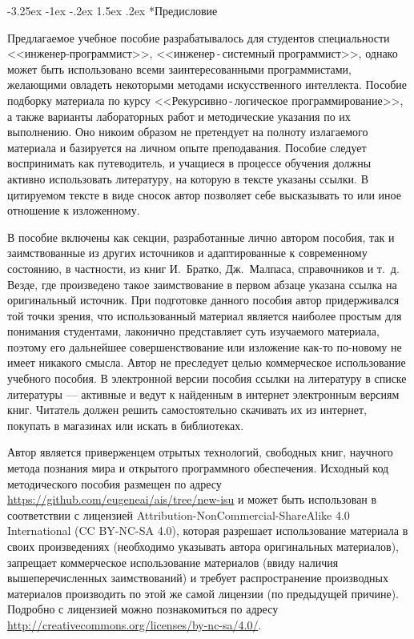 \documentclass[12pt, openany, twoside]{book} %
\makeatletter
\renewcommand\section{\@startsection {section}{1}{\z@}%
                                   {-3.25ex \@plus -1ex \@minus -.2ex}%
                                   {1.5ex \@plus.2ex}%
                                   {\normalfont\large\bfseries}}
\makeatother
\begin{document}
\newpage
\section*{Предисловие}
\thispagestyle{empty}

Предлагаемое учебное пособие разрабатывалось для студентов специальности <<инженер-программист>>, <<инженер\,{}-\,{}системный программист>>, однако может быть использовано всеми заинтересованными программистами, желающими овладеть некоторыми методами искусственного интеллекта. Пособие подборку материала по курсу <<Рекурсивно\,{}-\,{}логическое программирование>>, а также варианты лабораторных работ и методические указания по их выполнению. Оно никоим образом не претендует на полноту излагаемого материала и базируется на личном опыте преподавания. Пособие следует воспринимать как путеводитель, и учащиеся в процессе обучения должны активно использовать литературу, на которую в тексте указаны ссылки. В цитируемом тексте в виде сносок автор позволяет себе высказывать то или иное отношение к изложенному.

В пособие включены как секции, разработанные лично автором пособия, так и заимствованные из других источников и адаптированные к современному состоянию, в частности, из книг И.~Братко, Дж.~Малпаса, справочников и т.~д. Везде, где произведено такое заимствование в первом абзаце указана ссылка на оригинальный источник. При подготовке данного пособия автор придерживался той точки зрения, что использованный материал является наиболее простым для понимания студентами, лаконично представляет суть изучаемого материала, поэтому его дальнейшее совершенствование или изложение как-то по-новому не имеет никакого смысла. Автор не преследует целью коммерческое использование учебного пособия. В электронной версии пособия ссылки на литературу в списке литературы --- активные и ведут к найденным в интернет электронным версиям книг. Читатель должен решить самостоятельно скачивать их из интернет, покупать в магазинах или искать в библиотеках.

Автор является приверженцем отрытых технологий, свободных книг, научного метода познания мира и открытого программного обеспечения. Исходный код методического пособия размещен по адресу \url{https://github.com/eugeneai/ais/tree/new-isu} и может быть использован в соответствии с лицензией Attribution-NonCommercial-ShareAlike 4.0 International (CC BY-NC-SA 4.0), которая разрешает использование материала в своих произведениях (необходимо указывать автора оригинальных материалов), запрещает коммерческое использование материалов (ввиду наличия вышеперечисленных заимствований) и требует распространение производных материалов производить по этой же самой лицензии (по предыдущей причине). Подробно с лицензией можно познакомиться по адресу \url{http://creativecommons.org/licenses/by-nc-sa/4.0/}.
\end{document}
